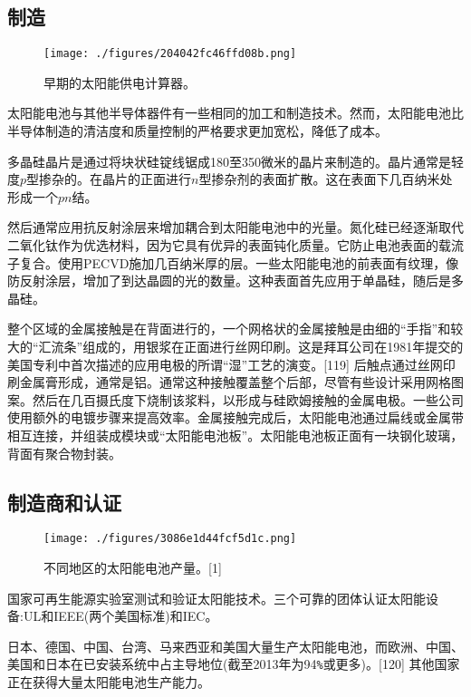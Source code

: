 \subsection{制造}

\begin{figure}[ht]
\centering
\texttt{[image: ./figures/204042fc46ffd08b.png]}
\caption{早期的太阳能供电计算器。} \label{fig_TYNDC_3}
\end{figure}

太阳能电池与其他半导体器件有一些相同的加工和制造技术。然而，太阳能电池比半导体制造的清洁度和质量控制的严格要求更加宽松，降低了成本。

多晶硅晶片是通过将块状硅锭线锯成180至350微米的晶片来制造的。晶片通常是轻度$p$型掺杂的。在晶片的正面进行$n$型掺杂剂的表面扩散。这在表面下几百纳米处形成一个$pn$结。

然后通常应用抗反射涂层来增加耦合到太阳能电池中的光量。氮化硅已经逐渐取代二氧化钛作为优选材料，因为它具有优异的表面钝化质量。它防止电池表面的载流子复合。使用PECVD施加几百纳米厚的层。一些太阳能电池的前表面有纹理，像防反射涂层，增加了到达晶圆的光的数量。这种表面首先应用于单晶硅，随后是多晶硅。

整个区域的金属接触是在背面进行的，一个网格状的金属接触是由细的“手指”和较大的“汇流条”组成的，用银浆在正面进行丝网印刷。这是拜耳公司在1981年提交的美国专利中首次描述的应用电极的所谓“湿”工艺的演变。[119] 后触点通过丝网印刷金属膏形成，通常是铝。通常这种接触覆盖整个后部，尽管有些设计采用网格图案。然后在几百摄氏度下烧制该浆料，以形成与硅欧姆接触的金属电极。一些公司使用额外的电镀步骤来提高效率。金属接触完成后，太阳能电池通过扁线或金属带相互连接，并组装成模块或“太阳能电池板”。太阳能电池板正面有一块钢化玻璃，背面有聚合物封装。

\subsection{制造商和认证}

\begin{figure}[ht]
\centering
\texttt{[image: ./figures/3086e1d44fcf5d1c.png]}
\caption{不同地区的太阳能电池产量。[1]} \label{fig_TYNDC_2}
\end{figure}

国家可再生能源实验室测试和验证太阳能技术。三个可靠的团体认证太阳能设备:UL和IEEE(两个美国标准)和IEC。

日本、德国、中国、台湾、马来西亚和美国大量生产太阳能电池，而欧洲、中国、美国和日本在已安装系统中占主导地位(截至2013年为94\verb|%|或更多)。[120] 其他国家正在获得大量太阳能电池生产能力。

